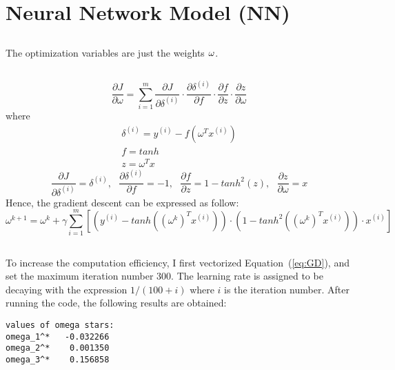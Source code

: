 \documentclass[12pt]{article}
\begin{document}
\section{Neural Network Model (NN)}
\subsection{}
The optimization variables are just the weights $\bf{\omega}$.
\subsection{}
\begin{equation}
\frac{\partial J}{\partial\omega}=\sum_{i=1}^m\frac{\partial J}{\partial\delta^{(i)}}\cdot\frac{\partial\delta^{(i)}}{\partial f}\cdot\frac{\partial f}{\partial z}\cdot\frac{\partial z}{\partial\omega}
\end{equation}
where
\begin{align}
\delta^{(i)}=y^{(i)}-f(\omega^Tx^{(i)})\\
f=tanh\\
z=\omega^Tx
\end{align}
\begin{equation}
\frac{\partial J}{\partial\delta^{(i)}}=\delta^{(i)},\ \ \ \frac{\partial\delta^{(i)}}{\partial f}=-1,\ \ \ \frac{\partial f}{\partial z}=1-tanh^2(z),\ \ \ \frac{\partial z}{\partial\omega}=x 
\end{equation}
Hence, the gradient descent can be expressed as follow:
\begin{equation}\label{eq:GD}
\omega^{k+1}=\omega^k+\gamma\sum_{i=1}^m\left[(y^{(i)}-tanh((\omega^k)^Tx^{(i)}))\cdot(1-tanh^2((\omega^k)^Tx^{(i)}))\cdot x^{(i)}\right]
\end{equation}
\subsection{}
To increase the computation efficiency, I first vectorized Equation~(\ref{eq:GD}), and set the maximum iteration number 300. The learning rate is assigned to be decaying with the expression $1/(100+i)$ where $i$ is the iteration number. After running the code, the following results are obtained:
\begin{verbatim}
values of omega stars:
omega_1^*   -0.032266
omega_2^*    0.001350
omega_3^*    0.156858
\end{verbatim}
\newpage
\end{document}
